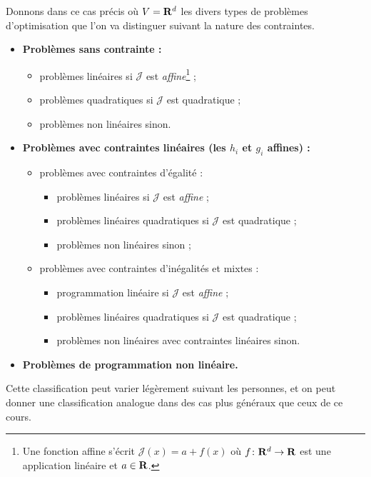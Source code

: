 \documentclass[grape]{../ceri/sty/MasterNotes}
\newcommand\J{\mathcal J}
\begin{document}
Donnons dans ce cas précis où $V=\mathbf{R}^d$ les divers types de problèmes d'optimisation que l'on va distinguer suivant la nature des contraintes.
\begin{itemize}%
    \item \textbf{Problèmes sans contrainte :}
          \begin{itemize}%
              \item problèmes linéaires si $\J$ est \textit{affine}\footnote{Une fonction affine s'écrit $\J(x)=a+f(x)$ où $f\colon\mathbf{R}^d\to\mathbf{R}$ est une application linéaire et $a\in\mathbf{R}$.} ;
              \item problèmes quadratiques si $\J$ est quadratique ;
              \item problèmes non linéaires sinon.
          \end{itemize}
    \item \textbf{Problèmes avec contraintes linéaires (les $h_i$ et $g_i$ affines) :}
          \begin{itemize}%
              \item problèmes avec contraintes d'égalité :
                    \begin{itemize}%
                        \item problèmes linéaires si $\J$ est \textit{affine} ;
                        \item problèmes linéaires quadratiques si $\J$ est quadratique ;
                        \item problèmes non linéaires sinon ;
                    \end{itemize}
              \item problèmes avec contraintes d'inégalités et mixtes :
                    \begin{itemize}%
                        \item programmation linéaire si $\J$ est \textit{affine} ;
                        \item problèmes linéaires quadratiques si $\J$ est quadratique ;
                        \item problèmes non linéaires avec contraintes linéaires sinon.
                    \end{itemize}
          \end{itemize}
    \item \textbf{Problèmes de programmation non linéaire.}
\end{itemize}

Cette classification peut varier légèrement suivant les personnes, et on peut donner une classification analogue dans des cas plus généraux que ceux de ce cours.
\end{document}
